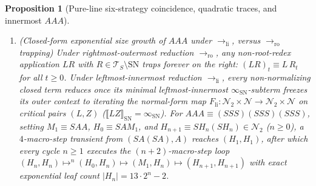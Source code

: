 \documentclass[11pt,reqno]{amsart}
\numberwithin{equation}{section}
\theoremstyle{plain}
\newtheorem{proposition}[theorem]{Proposition}
\theoremstyle{definition}
\theoremstyle{remark}
\begin{document}
\begin{proposition}[Pure-line six-strategy coincidence, quadratic traces, and innermost $A A A$]
\begin{enumerate}[label=(\roman*)]
\item \emph{(Closed-form exponential size growth of $A A A$ under $\to_{\mathrm{li}}$, versus $\to_{\mathrm{ro}}$ trapping)} Under rightmost-outermost reduction $\to_{\mathrm{ro}}$, any non-root-redex application $L R$ with $R \in \mathcal{T}_S \setminus \mathrm{SN}$ traps forever on the right: $(L R)_t \equiv L\,R_t$ for all $t \ge 0$. Under leftmost-innermost reduction $\to_{\mathrm{li}}$, every non-normalizing closed term reduces once its minimal leftmost-innermost $\infty_{\mathrm{SN}}$-subterm freezes its outer context to iterating the normal-form map $F_{\mathrm{li}} : \mathcal{N}_2 \times \mathcal{N} \to \mathcal{N}_2 \times \mathcal{N}$ on critical pairs $(L, Z)$ ($\llbracket L Z \rrbracket_{\mathrm{SN}} = \infty_{\mathrm{SN}}$). For $A A A \equiv (S S S)(S S S)(S S S)$, setting $M_1 \equiv S A A$, $H_0 \equiv S A M_1$, and $H_{n+1} \equiv S H_n (S H_n) \in \mathcal{N}_2$ ($n \ge 0$), a $4$-macro-step transient from $(S A (S A), A)$ reaches $(H_1, H_1)$, after which every cycle $n \ge 1$ executes the $(n+2)$-macro-step loop $(H_n, H_n) \mapsto^n (H_0, H_n) \mapsto (M_1, H_n) \mapsto (H_{n+1}, H_{n+1})$ with exact exponential leaf count $|H_n| = 13 \cdot 2^n - 2$.
\end{enumerate}
\end{proposition}
\end{document}
